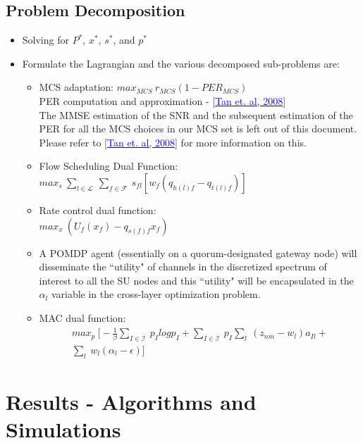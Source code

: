 \documentclass[12pt, draftcls, onecolumn]{IEEEtran}
\begin{document}
\subsection{Problem Decomposition}
\begin{itemize}
    \item Solving for $P^*$, $x^*$, $s^*$, and $p^*$
    \item Formulate the Lagrangian and the various decomposed sub-problems are:
    \begin{itemize}
        \item MCS adaptation: $max_{MCS}\ r_{MCS}(1 - PER_{MCS})$
        \\PER computation and approximation - [\href{https://ieeexplore.ieee.org/document/4641969}{\textcolor{blue}{Tan et. al, 2008}}]
        \\The MMSE estimation of the SNR and the subsequent estimation of the PER for all the MCS choices in our MCS set is left out of this document. Please refer to [\href{https://ieeexplore.ieee.org/document/4641969}{\textcolor{blue}{Tan et. al, 2008}}] for more information on this.
        \item Flow Scheduling Dual Function:
        $max_{s}\ \sum_{l \in \mathcal{L}}\ \sum_{f \in \mathcal{F}}\ s_{fl}[w_f(q_{h(l)f} - q_{t(l)f})]$
        \item Rate control dual function:
        \\$max_x\ (U_f(x_f) - q_{s(f)f}x_f)$
        \item A POMDP agent (essentially on a quorum-designated gateway node) will disseminate the ``utility" of channels in the discretized spectrum of interest to all the SU nodes and this ``utility" will be encapsulated in the $\alpha_l$ variable in the cross-layer optimization problem.
        \item MAC dual function:
        \begin{equation*}
            \begin{aligned}
                max_p\ \Big[- \frac{1}{\beta}\sum_{I \in \mathcal{I}}\ p_I log p_I + \sum_{I \in \mathcal{I}}\ p_I\sum_{l}\ (z_{nm} - w_l)a_{Il} + \\\sum_{l}\ w_l(\alpha_l - \epsilon)\Big]
            \end{aligned}
        \end{equation*}
    \end{itemize}
\end{itemize}
\section{Results - Algorithms and Simulations}
\end{document}
